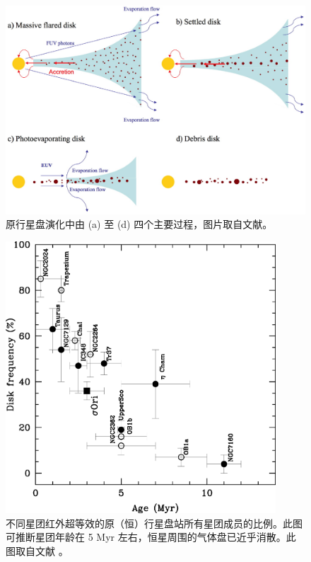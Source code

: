 \begin{figure}[t]
\centering
\includegraphics[width=1.0\textwidth]{figures/chapter1/fig10_discevo.eps}
\caption[原行星盘演化中后期四个主要过程，图片版权 Williams 和 Cieza。]{原行星盘演化中由 (a) 至 (d) 四个主要过程，图片取自文献。 }
\label{fig:discevo}
\end{figure}

\begin{figure}[t]
\centering
\includegraphics[width=0.9\textwidth]{figures/chapter1/fig11_pftimescale.eps}
\caption[不同星团红外超等效的原（恒）行星盘站所有星团成员的比例。此图可推断星团年龄老于10 Myr 后，恒星周围的气体盘已近乎完全消散。此图版权所有：Hern{\'a}ndez J. 等人。]{不同星团红外超等效的原（恒）行星盘站所有星团成员的比例。此图可推断星团年龄在 5 Myr 左右，恒星周围的气体盘已近乎消散。此图取自文献 。}
\label{fig:pftimescale}
\end{figure}


